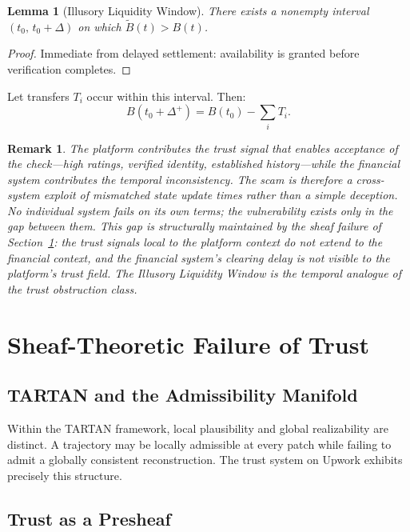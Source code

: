 \documentclass[11pt]{article}
\newtheorem{lemma}[theorem]{Lemma}
\newtheorem{remark}[theorem]{Remark}
\begin{document}
\begin{lemma}[Illusory Liquidity Window]
There exists a nonempty interval $(t_0,\, t_0 + \Delta)$ on which
$\widetilde{B}(t) > B(t)$.
\end{lemma}

\begin{proof}
Immediate from delayed settlement: availability is granted before
verification completes.
\end{proof}

Let transfers $T_i$ occur within this interval. Then:
\[
B(t_0 + \Delta^+) = B(t_0) - \sum_i T_i.
\]

\begin{remark}
The platform contributes the trust signal that enables acceptance of the
check---high ratings, verified identity, established history---while the
financial system contributes the temporal inconsistency. The scam is
therefore a cross-system exploit of mismatched state update times rather
than a simple deception. No individual system fails on its own terms; the
vulnerability exists only in the gap between them. This gap is structurally
maintained by the sheaf failure of Section~\ref{sec:sheaf}: the trust
signals local to the platform context do not extend to the financial context,
and the financial system's clearing delay is not visible to the platform's
trust field. The Illusory Liquidity Window is the temporal analogue of the
trust obstruction class.
\end{remark}

\section{Sheaf-Theoretic Failure of Trust}
\label{sec:sheaf}

\subsection{TARTAN and the Admissibility Manifold}

Within the TARTAN framework, local plausibility and global realizability are
distinct. A trajectory may be locally admissible at every patch while failing
to admit a globally consistent reconstruction. The trust system on Upwork
exhibits precisely this structure.

\subsection{Trust as a Presheaf}
\end{document}
